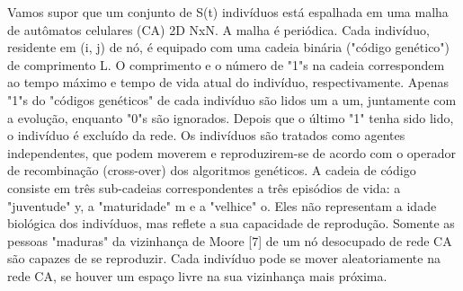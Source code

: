 \documentclass{article}
\begin{document}

Vamos supor que um conjunto de S(t) indivíduos está espalhada em uma malha de autômatos celulares (CA) 2D NxN. A malha é periódica. Cada indivíduo, residente em (i, j) de nó, é equipado com uma cadeia binária ("código genético") de comprimento L. O comprimento e o número de "1"s na cadeia correspondem ao tempo máximo e tempo de vida atual do indivíduo, respectivamente. Apenas "1"s do "códigos genéticos" de cada indivíduo são lidos um a um, juntamente com a evolução, enquanto "0"s são ignorados. Depois que o último "1" tenha sido lido, o indivíduo é excluído da rede. Os indivíduos são tratados como agentes independentes, que podem moverem e reproduzirem-se de acordo com o operador de recombinação (cross-over) dos algoritmos genéticos. A cadeia de código consiste em três sub-cadeias correspondentes a três episódios de vida: a "juventude" y, a "maturidade" m e a "velhice" o. Eles não representam a idade biológica dos indivíduos, mas reflete a sua capacidade de reprodução. Somente as pessoas "maduras" da vizinhança de Moore [7] de um nó desocupado de rede CA são capazes de se reproduzir. Cada indivíduo pode se mover aleatoriamente na rede CA, se houver um espaço livre na sua vizinhança mais próxima.

\end{document}
